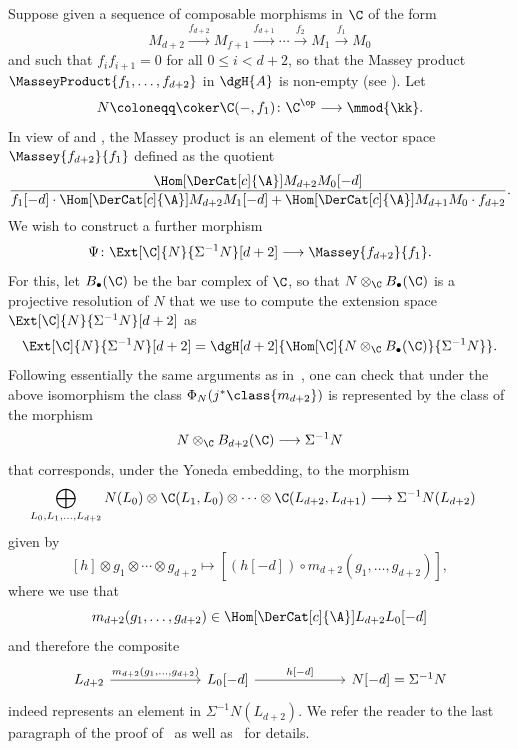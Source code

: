 \documentclass[a4paper]{amsart}
\begin{document}
Suppose given a sequence of composable morphisms in $\C$ of the form
\[
  M_{d+2}\xrightarrow{f_{d+2}}M_{f+1}\xrightarrow{f_{d+1}}\cdots\xrightarrow{f_2}M_1\xrightarrow{f_1}M_0
\]
and such that $f_if_{i+1}=0$ for all $0\leq i<d+2$, so that the Massey product
$\MasseyProduct{f_1,\dots,f_{d+2}}$ in $\dgH{A}$ is non-empty (see
). Let
\[
  N\coloneqq\coker\C(-,f_1)\colon\C^\op\longrightarrow\mmod{\kk}.
\]
In view of  and ,
the Massey product is an element of the vector space $\Massey{f_{d+2}}{f_1}$
defined as the quotient
\[
  \frac{\Hom[\DerCat[c]{\A}]{M_{d+2}}{M_0[-d]}}{f_1[-d]\cdot\Hom[\DerCat[c]{\A}]{M_{d+2}}{M_1[-d]}+\Hom[\DerCat[c]{\A}]{M_{d+1}}{M_0}\cdot
    f_{d+2}}.
\]
We wish to construct a further morphism
\[
  \Psi\colon\Ext[\C]{N}{\Sigma^{-1}N}[d+2]\longrightarrow\Massey{f_{d+2}}{f_1}.
\]
For this, let $B_\bullet(\C)$ be the bar complex of $\C$, so that $N\otimes_\C
B_\bullet(\C)$ is a projective resolution of $N$ that we use to compute the
extension space $\Ext[\C]{N}{\Sigma^{-1}N}[d+2]$ as
\[
  \Ext[\C]{N}{\Sigma^{-1}N}[d+2]=\dgH[d+2]{\Hom[\C]{N\otimes_\C
      B_\bullet(\C)}{\Sigma^{-1}N}}.
\]
Following essentially the same arguments as in~\cite[Sec.~5]{Mur20a}, one can
check that under the above isomorphism the class $\Phi_N(j^*\class{m_{d+2}})$ is
represented by the class of the morphism
\[
  N\otimes_\C B_{d+2}(\C)\longrightarrow \Sigma^{-1} N
\]
that corresponds, under the Yoneda embedding, to the morphism
\begin{align*}
  \bigoplus_{L_0,L_1,\dots,L_{d+2}}N(L_0)\otimes\C(L_1,L_0)\otimes\cdots\otimes\C(L_{d+2},L_{d+1}) & \longrightarrow \Sigma^{-1}N(L_{d+2})
\end{align*}
given by
\begin{equation}
  \label{eq:aux_PhiN}
  [h]\otimes g_1\otimes\cdots\otimes g_{d+2}\longmapsto[(h[-d])\circ m_{d+2}(g_1,\dots,g_{d+2})],
\end{equation}
where we use that
\[
  m_{d+2}(g_1,\dots,g_{d+2})\in\Hom[\DerCat[c]{\A}]{L_{d+2}}{L_0[-d]}
\]
and therefore the composite
\[
  \begin{tikzcd}[column sep={6.5em}]
    L_{d+2}\rar{m_{d+2}(g_1,\dots,g_{d+2})}&L_0[-d]\rar{h[-d]}&N[-d]=\Sigma^{-1}N
  \end{tikzcd}
\]
indeed represents an element in $\Sigma^{-1}N(L_{d+2})$. We refer the reader to
the last paragraph of the proof of~\cite[Prop.~5.2]{Mur20a} as well
as~\cite[Prop.~5.6 and Rmks.~5.4 and 5.7]{Mur20a} for details.
\end{document}
